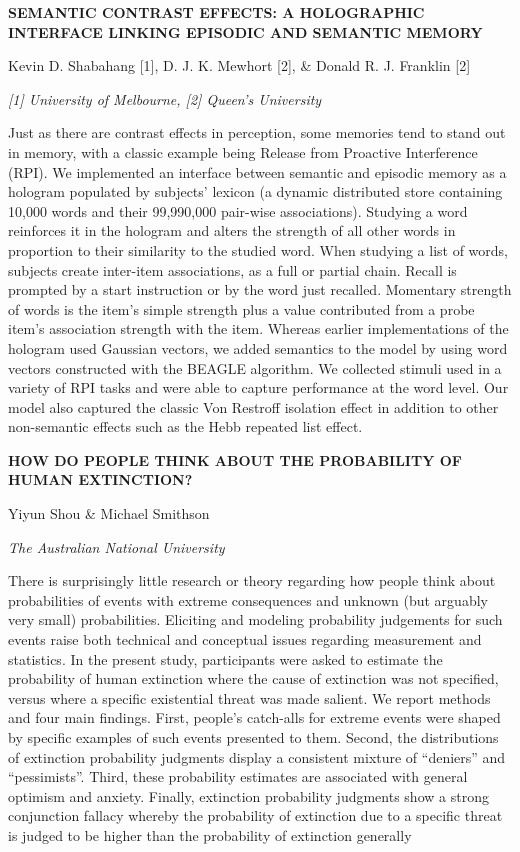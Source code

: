\documentclass[]{article}
\begin{document}
\textbf{SEMANTIC CONTRAST EFFECTS: A HOLOGRAPHIC INTERFACE LINKING
EPISODIC AND SEMANTIC MEMORY}

Kevin D. Shabahang {[}1{]}, D. J. K. Mewhort {[}2{]}, \& Donald R. J.
Franklin {[}2{]}

\emph{{[}1{]} University of Melbourne, {[}2{]} Queen's University}

Just as there are contrast effects in perception, some memories tend to
stand out in memory, with a classic example being Release from Proactive
Interference (RPI). We implemented an interface between semantic and
episodic memory as a hologram populated by subjects' lexicon (a dynamic
distributed store containing 10,000 words and their 99,990,000 pair-wise
associations). Studying a word reinforces it in the hologram and alters
the strength of all other words in proportion to their similarity to the
studied word. When studying a list of words, subjects create inter-item
associations, as a full or partial chain. Recall is prompted by a start
instruction or by the word just recalled. Momentary strength of words is
the item's simple strength plus a value contributed from a probe item's
association strength with the item. Whereas earlier implementations of
the hologram used Gaussian vectors, we added semantics to the model by
using word vectors constructed with the BEAGLE algorithm. We collected
stimuli used in a variety of RPI tasks and were able to capture
performance at the word level. Our model also captured the classic Von
Restroff isolation effect in addition to other non-semantic effects such
as the Hebb repeated list effect.

\textbf{HOW DO PEOPLE THINK ABOUT THE PROBABILITY OF HUMAN EXTINCTION?}

Yiyun Shou \& Michael Smithson

\emph{The Australian National University }

There is surprisingly little research or theory regarding how people
think about probabilities of events with extreme consequences and
unknown (but arguably very small) probabilities. Eliciting and modeling
probability judgements for such events raise both technical and
conceptual issues regarding measurement and statistics. In the present
study, participants were asked to estimate the probability of human
extinction where the cause of extinction was not specified, versus where
a specific existential threat was made salient. We report methods and
four main findings. First, people's catch-alls for extreme events were
shaped by specific examples of such events presented to them. Second,
the distributions of extinction probability judgments display a
consistent mixture of ``deniers'' and ``pessimists''. Third, these
probability estimates are associated with general optimism and anxiety.
Finally, extinction probability judgments show a strong conjunction
fallacy whereby the probability of extinction due to a specific threat
is judged to be higher than the probability of extinction generally
\end{document}
